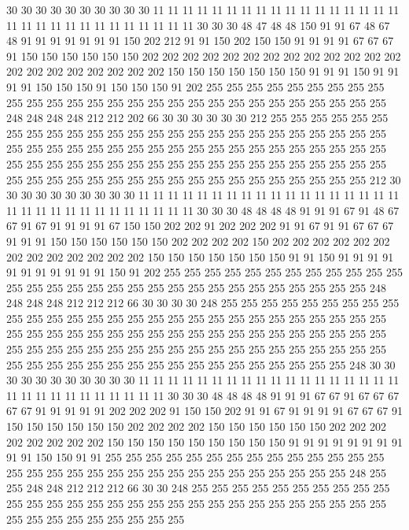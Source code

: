 30 30 30 30 30 30 30 30 30 30 11 11 11 11 11 11 11 11 11 11
11 11 11 11 11 11 11 11 11 11 11 11 11 11 11 11 11 11 11 11
30 30 30 48 47 48 48 150 91 91 67 48 67 48 91 91 91 91 91 91
91 150 202 212 91 91 150 202 150 150 91 91 91 91 67 67 67 91 150 150
150 150 150 150 202 202 202 202 202 202 202 202 202 202 202 202 202 202 202 202
202 202 202 202 202 150 150 150 150 150 150 150 91 91 91 150 91 91 91 91
150 150 150 91 150 150 150 91 202 255 255 255 255 255 255 255 255 255 255 255
255 255 255 255 255 255 255 255 255 255 255 255 255 255 255 255 255 248 248 248
248 212 212 202 66 30 30 30 30 30 30 212 255 255 255 255 255 255 255 255
255 255 255 255 255 255 255 255 255 255 255 255 255 255 255 255 255 255 255 255
255 255 255 255 255 255 255 255 255 255 255 255 255 255 255 255 255 255 255 255
255 255 255 255 255 255 255 255 255 255 255 255 255 255 255 255 255 255 255 255
255 255 255 255 255 255 255 255 255 255 255 255 255 212 30 30 30 30 30 30
30 30 30 30 11 11 11 11 11 11 11 11 11 11 11 11 11 11 11 11
11 11 11 11 11 11 11 11 11 11 11 11 11 11 11 30 30 30 48 48
48 48 91 91 91 67 91 48 67 67 91 67 91 91 91 91 67 150 150 202
202 91 202 202 202 91 91 67 91 91 67 67 67 91 91 91 150 150 150 150
150 150 202 202 202 202 150 202 202 202 202 202 202 202 202 202 202 202 202 202
150 150 150 150 150 150 150 91 91 150 91 91 91 91 91 91 91 91 91 91
91 150 91 202 255 255 255 255 255 255 255 255 255 255 255 255 255 255 255 255
255 255 255 255 255 255 255 255 255 255 255 255 255 255 248 248 248 248 212 212
212 66 30 30 30 30 248 255 255 255 255 255 255 255 255 255 255 255 255 255
255 255 255 255 255 255 255 255 255 255 255 255 255 255 255 255 255 255 255 255
255 255 255 255 255 255 255 255 255 255 255 255 255 255 255 255 255 255 255 255
255 255 255 255 255 255 255 255 255 255 255 255 255 255 255 255 255 255 255 255
255 255 255 255 255 255 255 255 255 255 248 30 30 30 30 30 30 30 30 30
30 30 11 11 11 11 11 11 11 11 11 11 11 11 11 11 11 11 11 11
11 11 11 11 11 11 11 11 11 11 11 30 30 30 48 48 48 48 91 91
91 67 67 91 67 67 67 67 67 91 91 91 91 91 202 202 202 91 150 150
202 91 91 67 91 91 91 91 67 67 67 91 150 150 150 150 150 150 202 202
202 202 150 150 150 150 150 150 202 202 202 202 202 202 202 202 150 150 150 150
150 150 150 150 150 91 91 91 91 91 91 91 91 91 91 150 150 91 91 255
255 255 255 255 255 255 255 255 255 255 255 255 255 255 255 255 255 255 255 255
255 255 255 255 255 255 255 255 255 255 248 255 255 248 248 212 212 212 66 30
30 248 255 255 255 255 255 255 255 255 255 255 255 255 255 255 255 255 255 255
255 255 255 255 255 255 255 255 255 255 255 255 255 255 255 255 255 255 255 255
